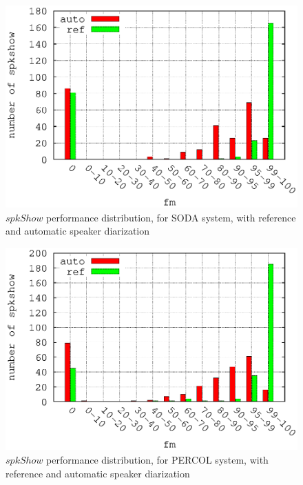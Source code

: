 \begin{figure}[!h]
\includegraphics[scale=0.6]{SODA.eps}
\caption{$spkShow$ performance distribution, for SODA system, with reference and automatic speaker diarization}
\end{figure}

\begin{figure}[!h]
\includegraphics[scale=0.6]{PERCOL.eps}
\caption{$spkShow$ performance distribution, for PERCOL system, with reference and automatic speaker diarization}
\end{figure}


